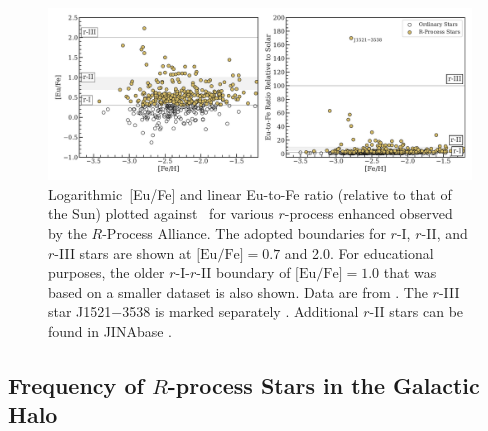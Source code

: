 \documentclass[letterpaper]{article}
\begin{document}
\begin{figure}[!h] 
\begin{center}
  \includegraphics[width=\linewidth]{figures/rpa_eufe.pdf}
   \caption{\mbox{Logarithmic [Eu/Fe]} and linear Eu-to-Fe ratio (relative to that of the Sun) plotted against \feh\ for various $r$-process enhanced observed by the $R$-Process Alliance. The adopted boundaries for $r$-I, $r$-II, and $r$-III stars are shown at $\mbox{[Eu/Fe]} = 0.7$ and 2.0. 
   For educational purposes, the older $r$-I-$r$-II boundary of $\mbox{[Eu/Fe]} = 1.0$ that was based on a smaller dataset is also shown.
   Data are from \citep{hansen18,sakari18,ezzeddine20, holmbeck20}. 
   The $r$-III star J1521$-$3538 is marked separately \citep{cain20}.
  Additional $r$-II stars can be found in JINAbase \citep{Abohalima18}. \label{fig:eufe}
   }
\end{center}
\end{figure}


\subsection{Frequency of $R$-process Stars in the Galactic Halo}
\end{document}
